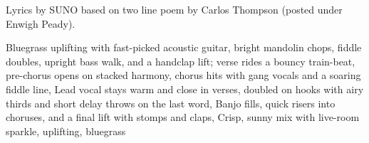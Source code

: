 
\begin{notes}
Lyrics by SUNO based on two line poem by Carlos Thompson (posted under Enwigh Peady).
\end{notes}
\begin{style}
Bluegrass uplifting with fast-picked acoustic guitar, bright mandolin chops, fiddle doubles, upright bass walk, and a handclap lift; verse rides a bouncy train-beat, pre-chorus opens on stacked harmony, chorus hits with gang vocals and a soaring fiddle line, Lead vocal stays warm and close in verses, doubled on hooks with airy thirds and short delay throws on the last word, Banjo fills, quick risers into choruses, and a final lift with stomps and claps, Crisp, sunny mix with live-room sparkle, uplifting, bluegrass
\end{style}
